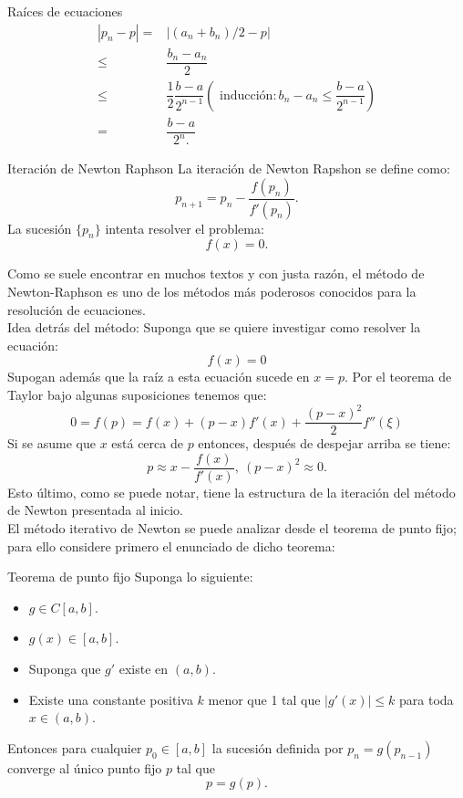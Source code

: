 \begin{frame}{Raíces de ecuaciones}
{\begin{align*}
|p_n-p|=&|(a_n+b_n)/2-p|\\
\leq & \dfrac{b_n-a_n}{2}\\
\leq & \dfrac{1}{2}\dfrac{b-a}{2^{n-1}} (\text{ inducción}: b_n-a_n\leq \dfrac{b-a}{2^{n-1}})\\
=& \dfrac{b-a}{2^n.}
\end{align*}
}
\begin{block}{Iteración de Newton Raphson}
La iteración de Newton Rapshon se define como:
$$p_{n+1}=p_n-\dfrac{f(p_n)}{f'(p_n)}.$$
La sucesión $\{p_n\}$ intenta resolver el problema:
$$f(x)=0.$$
\end{block}
\indent Como se suele encontrar en muchos textos y con justa razón, el método de Newton-Raphson  es uno de los métodos más poderosos conocidos para la resolución de ecuaciones. \\
\indent Idea detrás del método: Suponga que se quiere investigar como resolver la ecuación:
$$f(x)=0$$
\indent Supogan además que la raíz a esta ecuación sucede en $x=p.$ Por el teorema de Taylor bajo algunas suposiciones tenemos que:
$$0=f(p)=f(x)+(p-x)f'(x)+\dfrac{(p-x)^2}{2}f''(\xi)$$
\indent Si se asume que $x$ está cerca de $p$ entonces, después de despejar arriba se tiene:
$$p\approx x-\dfrac{f(x)}{f'(x)},\ (p-x)^2\approx 0.$$
\indent Esto último, como se puede notar, tiene la estructura de la iteración del método de Newton presentada al inicio.\\
\indent El método iterativo de Newton se puede analizar desde el teorema de punto fijo; para ello considere primero el enunciado de dicho teorema:
\framebreak
\begin{block}{Teorema de punto fijo}
Suponga lo siguiente:
\begin{itemize}
\item $g\in C[a,b].$
\item $g(x)\in[a,b].$
\item Suponga que $g'$ existe en $(a,b)$.
\item Existe una constante positiva $k$ menor que 1 tal que $|g'(x)|\leq k$
para toda $x\in (a,b).$
\end{itemize}
Entonces para cualquier $p_0\in[a,b]$ la sucesión definida por $p_n=g(p_{n-1})$ converge al único punto fijo $p$ tal que $$p=g(p).$$
\end{block}

\end{frame}
